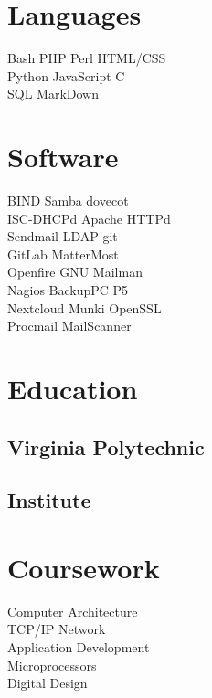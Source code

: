 \documentclass[letterpaper]{deedy-resume}
\begin{document}



\begin{minipage}[t]{0.27\textwidth}
\section{Languages}
Bash \textbullet{} PHP \textbullet{} Perl \textbullet{} HTML/CSS \\
Python \textbullet{} JavaScript \textbullet{} C \\
SQL \textbullet{} MarkDown

\sectionspace
\section{Software}
BIND \textbullet{} Samba \textbullet{} dovecot \\
ISC-DHCPd \textbullet{} Apache HTTPd \\
Sendmail \textbullet{} LDAP \textbullet{} git \\
GitLab \textbullet{}  MatterMost \\
Openfire \textbullet{} GNU Mailman \\
Nagios \textbullet{} BackupPC \textbullet{} P5 \\
Nextcloud \textbullet{} Munki \textbullet{} OpenSSL \\
Procmail \textbullet{} MailScanner

\sectionspace

\section{Education}
\subsection{Virginia Polytechnic}
\subsection{Institute}

\sectionspace

\section{Coursework}
Computer Architecture \\
TCP/IP Network\\
\hspace{3pt} Application Development \\
Microprocessors \\
Digital Design


\end{minipage}
\end{document}
